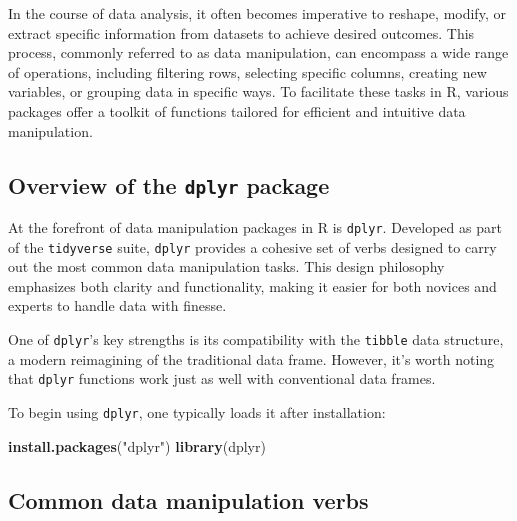 \documentclass[
  b5paper]{book}
\newenvironment{Shaded}{\begin{snugshade}}{\end{snugshade}}
\newcommand{\FunctionTok}[1]{\textcolor[rgb]{0.13,0.29,0.53}{\textbf{#1}}}
\newcommand{\NormalTok}[1]{#1}
\newcommand{\StringTok}[1]{\textcolor[rgb]{0.31,0.60,0.02}{#1}}
\begin{document}
In the course of data analysis, it often becomes imperative to reshape, modify, or extract specific information from datasets to achieve desired outcomes. This process, commonly referred to as data manipulation, can encompass a wide range of operations, including filtering rows, selecting specific columns, creating new variables, or grouping data in specific ways. To facilitate these tasks in R, various packages offer a toolkit of functions tailored for efficient and intuitive data manipulation.

\hypertarget{overview-of-the-dplyr-package}{%
\subsection*{\texorpdfstring{Overview of the \textbf{\texttt{dplyr}} package}{Overview of the dplyr package}}\label{overview-of-the-dplyr-package}}

At the forefront of data manipulation packages in R is \texttt{dplyr}. Developed as part of the \texttt{tidyverse} suite, \texttt{dplyr} provides a cohesive set of verbs designed to carry out the most common data manipulation tasks. This design philosophy emphasizes both clarity and functionality, making it easier for both novices and experts to handle data with finesse.

One of \texttt{dplyr}'s key strengths is its compatibility with the \texttt{tibble} data structure, a modern reimagining of the traditional data frame. However, it's worth noting that \texttt{dplyr} functions work just as well with conventional data frames.

To begin using \texttt{dplyr}, one typically loads it after installation:

\begin{Shaded}
\begin{Highlighting}[]
\FunctionTok{install.packages}\NormalTok{(}\StringTok{"dplyr"}\NormalTok{)}
\FunctionTok{library}\NormalTok{(dplyr)}
\end{Highlighting}
\end{Shaded}

\hypertarget{common-data-manipulation-verbs}{%
\subsection*{Common data manipulation verbs}\label{common-data-manipulation-verbs}}
\end{document}
